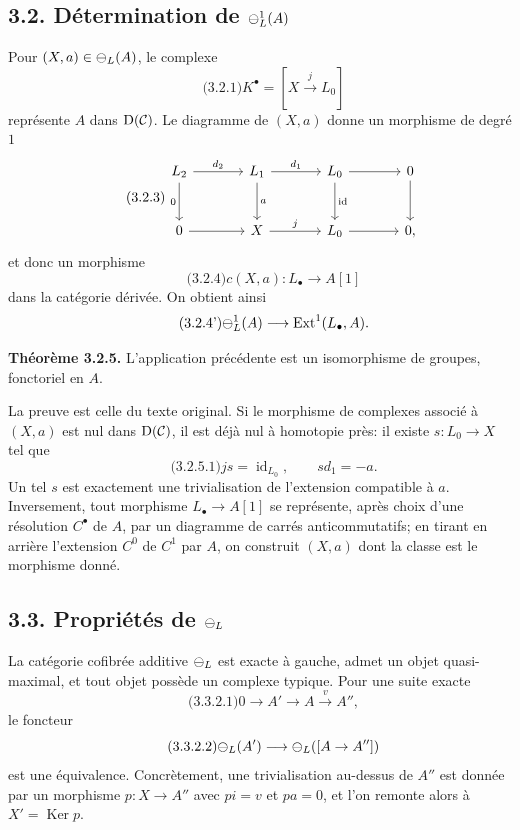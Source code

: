 \documentclass[11pt]{article}
\providecommand{\Ker}{\operatorname{Ker}}
\providecommand{\Ext}{\operatorname{Ext}}
\providecommand{\id}{\operatorname{id}}
\begin{document}
\subsection*{3.2. D\'etermination de \(\mathcal\Psi_L^1(A)\)}
Pour \((X,a)\in\mathcal\Psi_L(A)\), le complexe
\begin{equation}\qquad\text{(3.2.1)}
  K^\bullet=[X\xrightarrow{j}L_0]
\end{equation}
repr\'esente \(A\) dans \(\mathrm D(\mathcal C)\).  Le diagramme de \((X,a)\) donne un morphisme de degr\'e \(1\)
\begin{equation}\qquad\text{(3.2.3)}
\begin{tikzcd}[column sep=large,row sep=large]
L_2\arrow[r,"d_2"]\arrow[d,"0"']&L_1\arrow[r,"d_1"]\arrow[d,"a"]&L_0\arrow[d,"\id"]\arrow[r]&0\arrow[d]\\
0\arrow[r]&X\arrow[r,"j"]&L_0\arrow[r]&0,
\end{tikzcd}
\end{equation}
et donc un morphisme
\begin{equation}\qquad\text{(3.2.4)}
  c(X,a):L_\bullet\longrightarrow A[1]
\end{equation}
dans la cat\'egorie d\'eriv\'ee.  On obtient ainsi
\begin{equation}\qquad\text{(3.2.4')}
  \cPsi_L^1(A)\longrightarrow \Ext^1(L_\bullet,A).
\end{equation}

\textbf{Th\'eor\`eme 3.2.5.}  L'application pr\'ec\'edente est un isomorphisme de groupes, fonctoriel en \(A\).

La preuve est celle du texte original.  Si le morphisme de complexes associ\'e \`a \((X,a)\) est nul dans \(\mathrm D(\mathcal C)\), il est d\'ej\`a nul \`a homotopie pr\`es: il existe \(s:L_0\to X\) tel que
\begin{equation}\qquad\text{(3.2.5.1)}
  js=\id_{L_0},\qquad s d_1=-a.
\end{equation}
Un tel \(s\) est exactement une trivialisation de l'extension compatible \`a \(a\).  Inversement, tout morphisme \(L_\bullet\to A[1]\) se repr\'esente, apr\`es choix d'une r\'esolution \(C^\bullet\) de \(A\), par un diagramme de carr\'es anticommutatifs; en tirant en arri\`ere l'extension \(C^0\) de \(C^1\) par \(A\), on construit \((X,a)\) dont la classe est le morphisme donn\'e.

\subsection*{3.3. Propri\'et\'es de \(\mathcal\Psi_L\)}
La cat\'egorie cofibr\'ee additive \(\mathcal\Psi_L\) est exacte \`a gauche, admet un objet quasi-maximal, et tout objet poss\`ede un complexe typique.  Pour une suite exacte
\begin{equation}\qquad\text{(3.3.2.1)}
  0\to A'\to A\xrightarrow{v}A'',
\end{equation}
le foncteur
\begin{equation}\qquad\text{(3.3.2.2)}
  \mathcal\Psi_L(A')\longrightarrow\mathcal\Psi_L([A\to A''])
\end{equation}
est une équivalence.  Concr\`etement, une trivialisation au-dessus de \(A''\) est donn\'ee par un morphisme \(p:X\to A''\) avec \(pi=v\) et \(pa=0\), et l'on remonte alors \`a \(X'=\Ker p\).
\end{document}
